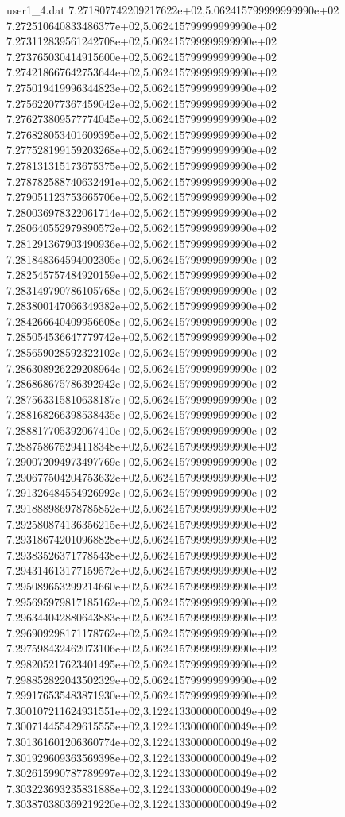 \begin{filecontents}{user1_4.dat}
7.271807742209217622e+02,5.062415799999999990e+02
7.272510640833486377e+02,5.062415799999999990e+02
7.273112839561242708e+02,5.062415799999999990e+02
7.273765030414915600e+02,5.062415799999999990e+02
7.274218667642753644e+02,5.062415799999999990e+02
7.275019419996344823e+02,5.062415799999999990e+02
7.275622077367459042e+02,5.062415799999999990e+02
7.276273809577774045e+02,5.062415799999999990e+02
7.276828053401609395e+02,5.062415799999999990e+02
7.277528199159203268e+02,5.062415799999999990e+02
7.278131315173675375e+02,5.062415799999999990e+02
7.278782588740632491e+02,5.062415799999999990e+02
7.279051123753665706e+02,5.062415799999999990e+02
7.280036978322061714e+02,5.062415799999999990e+02
7.280640552979890572e+02,5.062415799999999990e+02
7.281291367903490936e+02,5.062415799999999990e+02
7.281848364594002305e+02,5.062415799999999990e+02
7.282545757484920159e+02,5.062415799999999990e+02
7.283149790786105768e+02,5.062415799999999990e+02
7.283800147066349382e+02,5.062415799999999990e+02
7.284266640409956608e+02,5.062415799999999990e+02
7.285054536647779742e+02,5.062415799999999990e+02
7.285659028592322102e+02,5.062415799999999990e+02
7.286308926229208964e+02,5.062415799999999990e+02
7.286868675786392942e+02,5.062415799999999990e+02
7.287563315810638187e+02,5.062415799999999990e+02
7.288168266398538435e+02,5.062415799999999990e+02
7.288817705392067410e+02,5.062415799999999990e+02
7.288758675294118348e+02,5.062415799999999990e+02
7.290072094973497769e+02,5.062415799999999990e+02
7.290677504204753632e+02,5.062415799999999990e+02
7.291326484554926992e+02,5.062415799999999990e+02
7.291888986978785852e+02,5.062415799999999990e+02
7.292580874136356215e+02,5.062415799999999990e+02
7.293186742010968828e+02,5.062415799999999990e+02
7.293835263717785438e+02,5.062415799999999990e+02
7.294314613177159572e+02,5.062415799999999990e+02
7.295089653299214660e+02,5.062415799999999990e+02
7.295695979817185162e+02,5.062415799999999990e+02
7.296344042880643883e+02,5.062415799999999990e+02
7.296909298171178762e+02,5.062415799999999990e+02
7.297598432462073106e+02,5.062415799999999990e+02
7.298205217623401495e+02,5.062415799999999990e+02
7.298852822043502329e+02,5.062415799999999990e+02
7.299176535483871930e+02,5.062415799999999990e+02
7.300107211624931551e+02,3.122413300000000049e+02
7.300714455429615555e+02,3.122413300000000049e+02
7.301361601206360774e+02,3.122413300000000049e+02
7.301929609363569398e+02,3.122413300000000049e+02
7.302615990787789997e+02,3.122413300000000049e+02
7.303223693235831888e+02,3.122413300000000049e+02
7.303870380369219220e+02,3.122413300000000049e+02

\end{filecontents}
